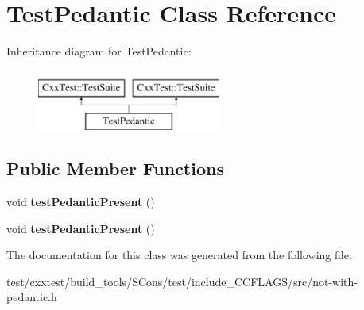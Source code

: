 \hypertarget{classTestPedantic}{\section{Test\-Pedantic Class Reference}
\label{classTestPedantic}
}
Inheritance diagram for Test\-Pedantic\-:\begin{figure}[H]
\begin{center}
\leavevmode
\includegraphics[height=2.000000cm]{classTestPedantic}
\end{center}
\end{figure}
\subsection*{Public Member Functions}
\begin{DoxyCompactItemize}
\item 
\hypertarget{classTestPedantic_a9e4a06f0bd7f055936380e827e364c4a}{void {\bfseries test\-Pedantic\-Present} ()}\label{classTestPedantic_a9e4a06f0bd7f055936380e827e364c4a}

\item 
\hypertarget{classTestPedantic_a9e4a06f0bd7f055936380e827e364c4a}{void {\bfseries test\-Pedantic\-Present} ()}\label{classTestPedantic_a9e4a06f0bd7f055936380e827e364c4a}

\end{DoxyCompactItemize}


The documentation for this class was generated from the following file\-:\begin{DoxyCompactItemize}
\item 
test/cxxtest/build\-\_\-tools/\-S\-Cons/test/include\-\_\-\-C\-C\-F\-L\-A\-G\-S/src/not-\/with-\/pedantic.\-h\end{DoxyCompactItemize}
